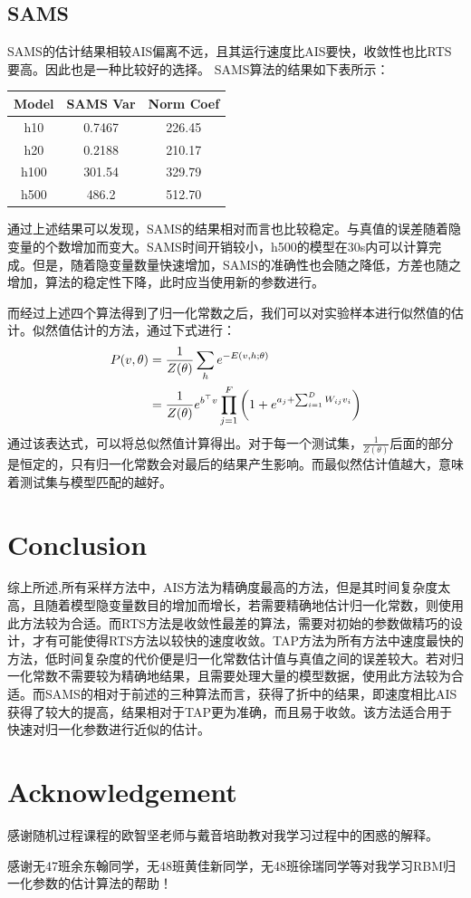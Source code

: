 \documentclass[journal,a4paper]{IEEEtran}
\begin{document}
	\subsection{SAMS}
		SAMS的估计结果相较AIS偏离不远，且其运行速度比AIS要快，收敛性也比RTS要高。因此也是一种比较好的选择。
		SAMS算法的结果如下表所示：
		\begin{center}
		\begin{tabular}{c|cc}
			\hline
			Model & SAMS Var & Norm Coef\\
			\hline
			h10 & 0.7467 &   226.45 \\
			h20 & 0.2188 & 210.17 \\
			h100 & 301.54 & 329.79\\
			h500 & 486.2 & 512.70\\
			\hline
		\end{tabular}
	\end{center}
		通过上述结果可以发现，SAMS的结果相对而言也比较稳定。与真值的误差随着隐变量的个数增加而变大。SAMS时间开销较小，h500的模型在30s内可以计算完成。但是，随着隐变量数量快速增加，SAMS的准确性也会随之降低，方差也随之增加，算法的稳定性下降，此时应当使用新的参数进行。
		
		而经过上述四个算法得到了归一化常数之后，我们可以对实验样本进行似然值的估计。似然值估计的方法，通过下式进行：
		\begin{align}
		P(v,\theta) & = \frac{1}{Z(\theta)}\sum_h e^{-E(v,h;\theta)} \notag \\
		& = \frac{1}{Z(\theta)} e^{b^{\top}v} \prod_{j=1}^F \left(1+e^{a_j+\sum_{i=1}^{D}W_{ij}v_i}\right)
		\end{align}
		通过该表达式，可以将总似然值计算得出。对于每一个测试集，$\frac{1}{Z(\theta)}$后面的部分是恒定的，只有归一化常数会对最后的结果产生影响。而最似然估计值越大，意味着测试集与模型匹配的越好。
		
	\section{Conclusion}
		综上所述,所有采样方法中，AIS方法为精确度最高的方法，但是其时间复杂度太高，且随着模型隐变量数目的增加而增长，若需要精确地估计归一化常数，则使用此方法较为合适。而RTS方法是收敛性最差的算法，需要对初始的参数做精巧的设计，才有可能使得RTS方法以较快的速度收敛。TAP方法为所有方法中速度最快的方法，低时间复杂度的代价便是归一化常数估计值与真值之间的误差较大。若对归一化常数不需要较为精确地结果，且需要处理大量的模型数据，使用此方法较为合适。而SAMS的相对于前述的三种算法而言，获得了折中的结果，即速度相比AIS获得了较大的提高，结果相对于TAP更为准确，而且易于收敛。该方法适合用于快速对归一化参数进行近似的估计。
		
	\section{Acknowledgement}
	感谢随机过程课程的欧智坚老师与戴音培助教对我学习过程中的困惑的解释。

	感谢无47班余东翰同学，无48班黄佳新同学，无48班徐瑞同学等对我学习RBM归一化参数的估计算法的帮助！

	
\end{document}
